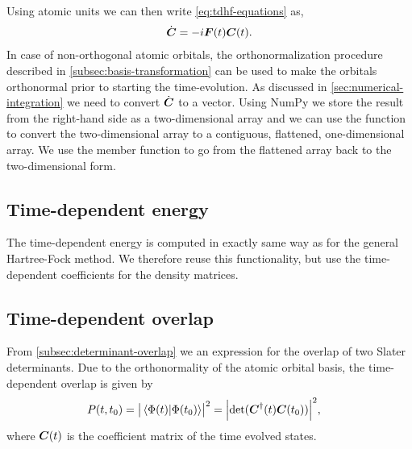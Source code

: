             Using atomic units we can then write \autoref{eq:tdhf-equations} as,
            \begin{align}
                \dot{\boldsymbol{C}} = -i\boldsymbol{F}(t)\boldsymbol{C}(t).
                \label{eq:tdhf-orthogonal}
            \end{align}
            In case of non-orthogonal atomic orbitals, the orthonormalization
            procedure described in \autoref{subsec:basis-transformation} can be
            used to make the orbitals orthonormal prior to starting the
            time-evolution.
            As discussed in \autoref{sec:numerical-integration} we need to
            convert $\dot{\boldsymbol{C}}$ to a vector.
            Using NumPy we store the result from the right-hand side as a
            two-dimensional array and we can use the function  to
            convert the two-dimensional array to a contiguous, flattened,
            one-dimensional array.
            We use the member function  to go from the flattened
            array back to the two-dimensional form.

        \subsection{Time-dependent energy}
            The time-dependent energy is computed in exactly same way as for the
            general Hartree-Fock method.
            We therefore reuse this functionality, but use the time-dependent
            coefficients for the density matrices.

        \subsection{Time-dependent overlap}
            From \autoref{subsec:determinant-overlap} we an expression for the
            overlap of two Slater determinants.
            Due to the orthonormality of the atomic orbital basis, the
            time-dependent overlap is given by
            \begin{align}
                P(t, t_0)
                =
                \abs{\braket*{\Phi(t)}{\Phi(t_0)}}^2
                &= \abs{\determinant(\vf{C}^{\dagger}(t)\vf{C}(t_0))}^{2},
            \end{align}
            where $\boldsymbol{C}(t)$ is the coefficient matrix of the time evolved states.


